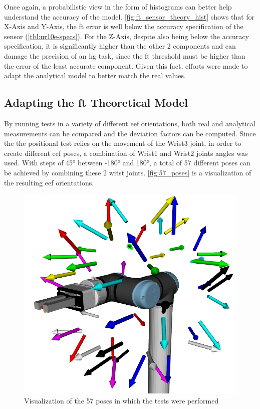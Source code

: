 \par Once again, a probabilistic view in the form of histograms can better help understand the accuracy of the model. \autoref{fig:ft_sensor_theory_hist} shows that for X-Axis and Y-Axis, the \ac{ft} error is well below the accuracy specification of the sensor (\autoref{tbl:ur10e-specs}). For the Z-Axis, despite also being below the accuracy specification, it is significantly higher than the other 2 components and can damage the precision of an \ac{hg} task, since the \ac{ft} threshold must be higher than the error of the least accurate component. Given this fact, efforts were made to adapt the analytical model to better match the real values. 



\subsection{Adapting the \ac{ft} Theoretical Model}
\label{ssec:ft_theory_model}


\par By running tests in a variety of different \ac{eef} orientations, both real and analytical measurements can be compared and the deviation factors can be computed. Since the the positional test relies on the movement of the Wrist3 joint, in order to create different \ac{eef} poses, a combination of Wrist1 and Wrist2 joints angles was used. With steps of \ang{45} between \ang{-180} and \ang{180}, a total of 57 different poses can be achieved by combining these 2 wrist joints. \autoref{fig:57_poses} is a visualization of the resulting \ac{eef} orientations.

\begin{figure}[h]
    \centering
    \includegraphics[width=0.35\linewidth]{figs/chp3/globe_57.png}
    \caption{Visualization of the 57 poses in which the tests were performed}
    \label{fig:57_poses}
\end{figure}

